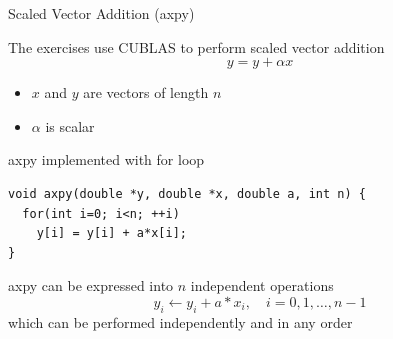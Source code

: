 \documentclass[aspectratio=43]{beamer}
\newcommand{\axpy}{{\ttfamily axpy}\xspace}
\begin{document}
\begin{frame}[fragile]{Scaled Vector Addition (\axpy)}
    \begin{info}{}
        The exercises use CUBLAS to perform scaled vector addition
            \vspace{-10pt}
            $$y = y + \alpha x$$
            \vspace{-25pt}
        \begin{itemize}
            \item $x$ and $y$ are vectors of length $n$
            \item $\alpha$ is scalar
        \end{itemize}
    \end{info}

    \begin{code}{\axpy implemented with for loop}
        \begin{lstlisting}[style=boxcuda]
void axpy(double *y, double *x, double a, int n) {
  for(int i=0; i<n; ++i)
    y[i] = y[i] + a*x[i];
}
        \end{lstlisting}
    \end{code}

    \begin{info}{}
        \axpy can be expressed into $n$ independent operations
        $$y_i \leftarrow y_i + a*x_i,\quad i = {0, 1, \dots, n-1}$$
        which can be performed independently and in any order
    \end{info}

\end{frame}
\end{document}
